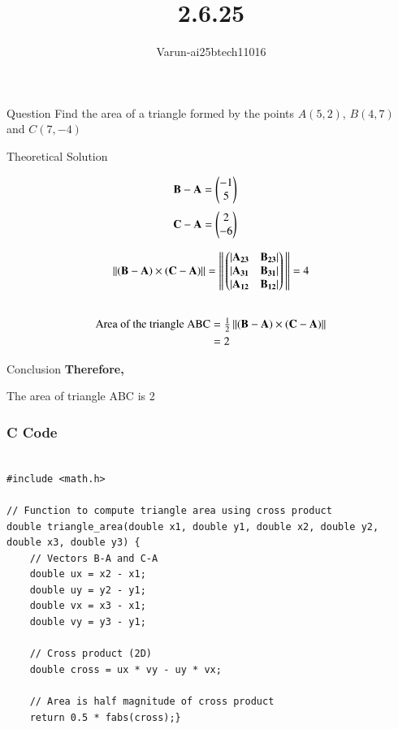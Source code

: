 \documentclass{beamer}
\title %
{2.6.25}
\author %
{Varun-ai25btech11016}
\begin{document}
\frame{\titlepage}
\begin{frame}{Question}
Find the area of a triangle formed by the points  $A(5,2)$, $B(4,7)$ and $C(7,-4)$

\end{frame}



\begin{frame}{Theoretical Solution }

\begin{align}
\mathbf{B} - \mathbf{A} &= \begin{pmatrix}-1 \\ 5\end{pmatrix}
\end{align}
\begin{align}
\mathbf{C} - \mathbf{A} & = \begin{pmatrix}2 \\ -6\end{pmatrix} 
\end{align}

\begin{align}
\left\lVert\mathbf{(B-A)} \times \mathbf{(C-A)}\right\rVert = \left\lVert\,\begin{pmatrix}|\mathbf{A_{23}} & \mathbf{B_{23}}| \\ |\mathbf{A_{31}} & \mathbf{B_{31}}| \\ |\mathbf{A_{12}} & \mathbf{B_{12}}|\end{pmatrix}\,\right\rVert 
&=4 \nonumber\\\
\end{align} 
\begin{align}
\text{Area of the triangle ABC} &= \tfrac{1}{2} 
\left\lVert(\mathbf{B} - \mathbf{A}) \times (\mathbf{C} - \mathbf{A}) \right\rVert \\
&=2 
\end{align}
\end{frame}
\begin{frame}{Conclusion}
\textbf{Therefore,
}
\begin{center}
    The area of triangle ABC is 2
\end{center}
\end{frame}
\begin{frame}[fragile]
    \frametitle{C Code}
\begin{lstlisting}

#include <math.h>

// Function to compute triangle area using cross product
double triangle_area(double x1, double y1, double x2, double y2, double x3, double y3) {
    // Vectors B-A and C-A
    double ux = x2 - x1;
    double uy = y2 - y1;
    double vx = x3 - x1;
    double vy = y3 - y1;

    // Cross product (2D)
    double cross = ux * vy - uy * vx;

    // Area is half magnitude of cross product
    return 0.5 * fabs(cross);}

\end{lstlisting}
\end{frame}
\end{document}
